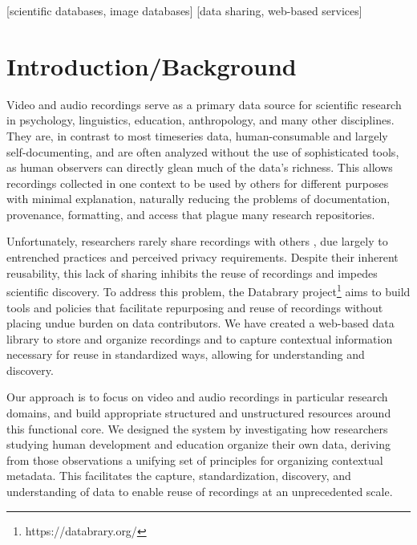 \documentclass{sig-alternate}
\begin{document}
[scientific databases, image databases]
[data sharing, web-based services]



\section{Introduction/Background}

Video and audio recordings serve as a primary data source for scientific research in psychology, linguistics, education, anthropology, and many other disciplines.
They are, in contrast to most timeseries data, human-consumable and largely self-documenting, and are often analyzed without the use of sophisticated tools, as human observers can directly glean much of the data's richness.
This allows recordings collected in one context to be used by others for different purposes with minimal explanation, naturally reducing the problems of documentation, provenance, formatting, and access that plague many research repositories.

Unfortunately, researchers rarely share recordings with others \cite{MacWhinney2001}, due largely to entrenched practices and perceived privacy requirements.
Despite their inherent reusability, this lack of sharing inhibits the reuse of recordings and impedes scientific discovery.
To address this problem, the Databrary project\footnote{https://databrary.org/} aims to build tools and policies that facilitate repurposing and reuse of recordings without placing undue burden on data contributors.
We have created a web-based data library to store and organize recordings and to capture contextual information necessary for reuse in standardized ways, allowing for understanding and discovery.

Our approach is to focus on video and audio recordings in particular research domains, and build appropriate structured and unstructured resources around this functional core.
We designed the system by investigating how researchers studying human development and education organize their own data, deriving from those observations a unifying set of principles for organizing contextual metadata.
This facilitates the capture, standardization, discovery, and understanding of data to enable reuse of recordings at an unprecedented scale.
\end{document}

